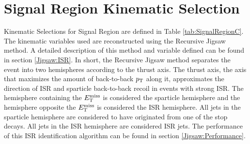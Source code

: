 



\section{Signal Region Kinematic Selection}
\label{sec:SR:Selections}

\indent Kinematic Selections for Signal Region are defined in Table \ref{tab:SignalRegionC}.\\

\indent The kinematic variables used are reconstructed using the Recursive Jigsaw method.  A detailed description of this method and variable defined can be found in section \ref{Jigsaw:ISR}.  In short, the Recursive Jigsaw method separates the event into two hemispheres according to the thrust axis.  The thrust axis, the axis that maximizes the amount of back-to-back $p_{\mathrm{T}}$ along it, approximates the direction of ISR and sparticle back-to-back recoil in events with strong ISR.  The hemisphere containing the $E_{\mathrm{T}}^{\mathrm{miss}}$ is considered the sparticle hemisphere and the hemisphere opposite the $E_{\mathrm{T}}^{\mathrm{miss}}$ is considered the ISR hemisphere.  All jets in the sparticle hemisphere are considered to have originated from one of the stop decays.  All jets in the ISR hemisphere are considered ISR jets.  The performance of this ISR identification algorithm can be found in section \ref{Jigsaw:Performance}. \\

